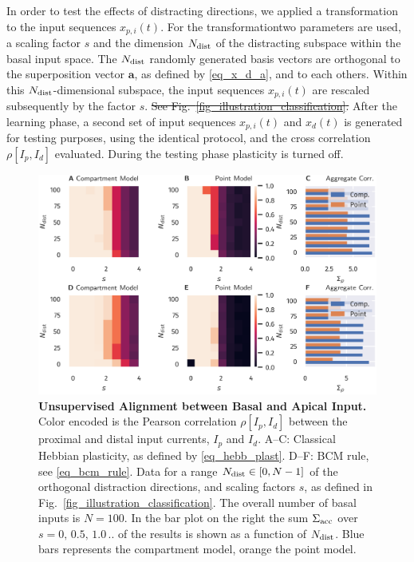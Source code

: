 \documentclass[utf8]{frontiersSCNS} %
\providecommand{\DIFaddtex}[1]{{\protect\color{blue}\uwave{#1}}} %
\providecommand{\DIFdeltex}[1]{{\protect\color{red}\sout{#1}}}                      %
\providecommand{\DIFaddbegin}{} %
\providecommand{\DIFaddend}{} %
\providecommand{\DIFdelbegin}{} %
\providecommand{\DIFdelend}{} %
\providecommand{\DIFadd}[1]{\texorpdfstring{\DIFaddtex{#1}}{#1}} %
\providecommand{\DIFdel}[1]{\texorpdfstring{\DIFdeltex{#1}}{}} %
\begin{document}
In order to test the effects of distracting directions,
we applied a transformation to the input sequences $x_{p,i}(t)$.
For the transformation\DIFaddbegin \DIFadd{, }\DIFaddend two parameters are used,
a scaling factor $s$ and the dimension $N_{\rm dist}$ 
of the distracting subspace within the basal input 
space. The $N_{\rm dist}$ randomly generated
basis vectors are orthogonal to the superposition
vector $\mathbf{a}$, as defined by \eqref{eq_x_d_a},
and to each others. Within this $N_{\rm dist}$-dimensional 
subspace, the input sequences $x_{p,i}(t)$ are
rescaled subsequently by the factor $s$. 
\DIFdelbegin \DIFdel{See Fig.~\ref{fig_illustration_classification}.
}\DIFdelend %
After the learning phase, a second set of input 
sequences $x_{p,i}(t)$ and $x_d(t)$ is generated for 
testing purposes, using the identical protocol, and
the cross correlation $\rho[I_p,I_d]$ 
evaluated. During the testing phase plasticity is 
turned off.

\begin{figure}[t]
\centering
\includegraphics[width=1.0\columnwidth]{corr_dimension_scaling_high_input_dim_composite}
\caption{{\bf Unsupervised Alignment between 
Basal and Apical Input.} Color
encoded is the Pearson correlation $\rho[I_p,I_d]$ 
between the proximal and distal input currents,
$I_p$ and $I_d$. A--C: Classical Hebbian 
plasticity, as defined by \eqref{eq_hebb_plast}.
D--F: BCM rule, see \eqref{eq_bcm_rule}. 
Data for a range $N_{\rm dist}\in[0,N-1]$
of the orthogonal distraction directions, 
and scaling factors $s$, as defined in
Fig.~\ref{fig_illustration_classification}.
The overall number of basal inputs is $N=100$.
In the bar plot on the right the sum
$\Sigma_{\rm acc}$ over $s=0,\,0.5,\,1.0\,..$ 
of the results is shown as a function
of $N_{\rm dist}$. Blue bars represents 
the compartment model, orange the point model.}
\label{fig_corr_dimension_scaling}
\end{figure}
\end{document}
